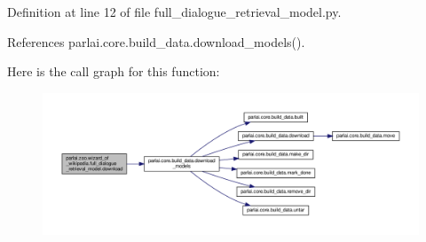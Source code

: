 Definition at line 12 of file full\+\_\+dialogue\+\_\+retrieval\+\_\+model.\+py.



References parlai.\+core.\+build\+\_\+data.\+download\+\_\+models().

Here is the call graph for this function\+:
\nopagebreak
\begin{figure}[H]
\begin{center}
\leavevmode
\includegraphics[width=350pt]{namespaceparlai_1_1zoo_1_1wizard__of__wikipedia_1_1full__dialogue__retrieval__model_ac0657f65992bc0ee1be1b6f673ae50e6_cgraph}
\end{center}
\end{figure}
